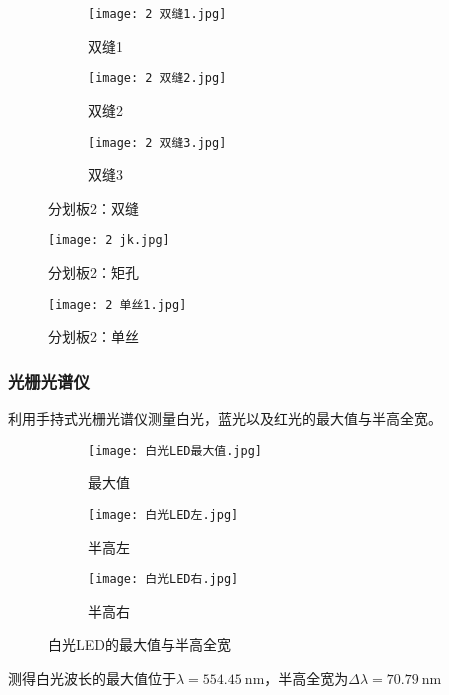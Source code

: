 \documentclass[11pt]{article}
\begin{document}
	\begin{figure}[H]
		\centering
		\begin{subfigure}{0.32\textwidth}
			\texttt{[image: 2 双缝1.jpg]}
			\caption{双缝1}
		\end{subfigure}
		\begin{subfigure}{0.32\textwidth}
			\texttt{[image: 2 双缝2.jpg]}
			\caption{双缝2}
		\end{subfigure}
		\begin{subfigure}{0.32\textwidth}
			\texttt{[image: 2 双缝3.jpg]}
			\caption{双缝3}
		\end{subfigure}
		\caption{分划板2：双缝}
		\label{fig:2双缝}
	\end{figure}
	
	\begin{figure}[H]
		\centering
		\texttt{[image: 2 jk.jpg]}
		\caption{分划板2：矩孔}
		\label{fig:2矩孔}
	\end{figure}
	
	\begin{figure}[H]
		\centering
		\texttt{[image: 2 单丝1.jpg]}
		\caption{分划板2：单丝}
		\label{fig:2单丝}
	\end{figure}
	
	\subsubsection{光栅光谱仪}
	利用手持式光栅光谱仪测量白光，蓝光以及红光的最大值与半高全宽。
	
	\begin{figure}[H]
		\centering
		\begin{subfigure}{0.32\textwidth}
			\texttt{[image: 白光LED最大值.jpg]}
			\caption{最大值}
		\end{subfigure}
		\begin{subfigure}{0.32\textwidth}
			\texttt{[image: 白光LED左.jpg]}
			\caption{半高左}
		\end{subfigure}
		\begin{subfigure}{0.32\textwidth}
			\texttt{[image: 白光LED右.jpg]}
			\caption{半高右}
		\end{subfigure}
		\caption{白光LED的最大值与半高全宽}
		\label{fig:白}
	\end{figure}
	测得白光波长的最大值位于$\lambda=554.45\ \mathrm{nm}$，半高全宽为$\Delta \lambda=70.79\ \mathrm{nm}$
	
\end{document}
